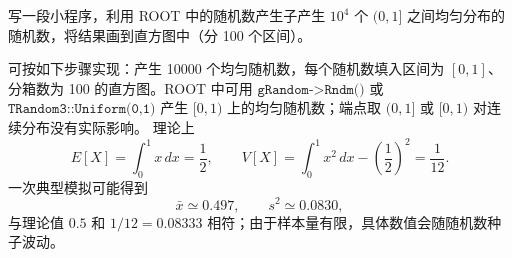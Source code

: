 ﻿





\begin{question}
写一段小程序，利用 ROOT 中的随机数产生子产生 \(10^4\) 个 \((0,1]\)
之间均匀分布的随机数，将结果画到直方图中（分 100 个区间）。
\begin{solution}
可按如下步骤实现：产生 10000 个均匀随机数，每个随机数填入区间为
\([0,1]\)、分箱数为 100 的直方图。ROOT 中可用
\(\texttt{gRandom->Rndm()}\) 或 \(\texttt{TRandom3::Uniform(0,1)}\) 产生
\([0,1)\) 上的均匀随机数；端点取 \((0,1]\) 或 \([0,1)\)
对连续分布没有实际影响。
理论上
\[
E[X]=\int_0^1 x\,dx=\frac12,
\qquad
V[X]=\int_0^1 x^2\,dx-\left(\frac12\right)^2=\frac1{12}.
\]
一次典型模拟可能得到
\[
\bar x\simeq0.497,
\qquad
s^2\simeq0.0830,
\]
与理论值 \(0.5\) 和 \(1/12=0.08333\) 相符；由于样本量有限，具体数值会随随机数种子波动。
\end{solution}
\end{question}



